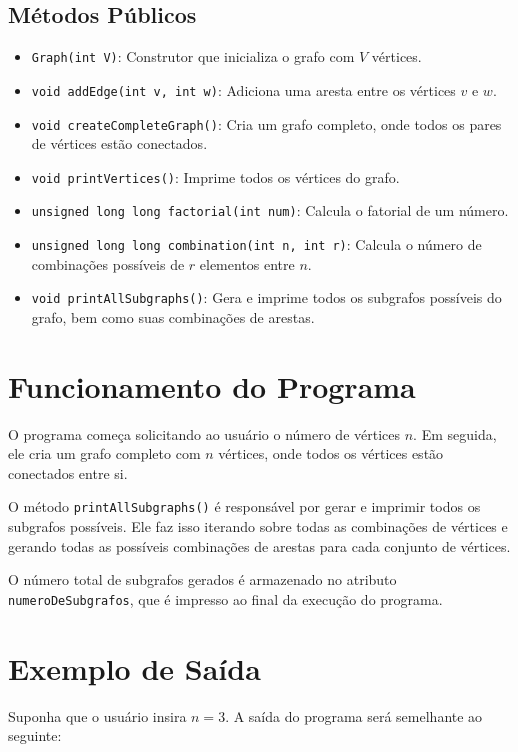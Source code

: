 \documentclass[a4paper,12pt]{article}
\begin{document}
\subsection{Métodos Públicos}
\begin{itemize}
    \item \texttt{Graph(int V)}: Construtor que inicializa o grafo com $V$ vértices.
    \item \texttt{void addEdge(int v, int w)}: Adiciona uma aresta entre os vértices $v$ e $w$.
    \item \texttt{void createCompleteGraph()}: Cria um grafo completo, onde todos os pares de vértices estão conectados.
    \item \texttt{void printVertices()}: Imprime todos os vértices do grafo.
    \item \texttt{unsigned long long factorial(int num)}: Calcula o fatorial de um número.
    \item \texttt{unsigned long long combination(int n, int r)}: Calcula o número de combinações possíveis de $r$ elementos entre $n$.
    \item \texttt{void printAllSubgraphs()}: Gera e imprime todos os subgrafos possíveis do grafo, bem como suas combinações de arestas.
\end{itemize}

\section{Funcionamento do Programa}

O programa começa solicitando ao usuário o número de vértices $n$. Em seguida, ele cria um grafo completo com $n$ vértices, onde todos os vértices estão conectados entre si.

O método \texttt{printAllSubgraphs()} é responsável por gerar e imprimir todos os subgrafos possíveis. Ele faz isso iterando sobre todas as combinações de vértices e gerando todas as possíveis combinações de arestas para cada conjunto de vértices.

O número total de subgrafos gerados é armazenado no atributo \texttt{numeroDeSubgrafos}, que é impresso ao final da execução do programa.

\section{Exemplo de Saída}

Suponha que o usuário insira $n = 3$. A saída do programa será semelhante ao seguinte:
\end{document}
